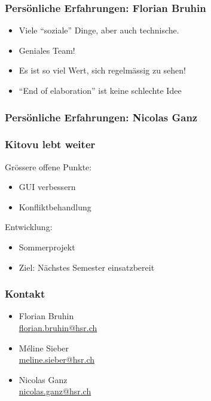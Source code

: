 \documentclass{beamer}
\begin{document}
	\begin{frame}
	   	\frametitle{Persönliche Erfahrungen: Florian Bruhin}
      \begin{itemize}
        \item Viele ``soziale'' Dinge, aber auch technische.
        \item Geniales Team!
        \item Es ist so viel Wert, sich regelmässig zu sehen!
        \item ``End of elaboration'' ist keine schlechte Idee
      \end{itemize}
	\end{frame}
	\begin{frame}
	    	\frametitle{Persönliche Erfahrungen: Nicolas Ganz}
	\end{frame}
	
	
	\begin{frame}
	\frametitle{Kitovu lebt weiter}
	
	Grössere offene Punkte:
	\begin{itemize}
	  \item GUI verbessern
	  \item Konfliktbehandlung
	\end{itemize}
	
	Entwicklung:
	\begin{itemize}
	  \item Sommerprojekt
	  \item Ziel: Nächstes Semester einsatzbereit
	\end{itemize}
	\end{frame}
	
	\begin{frame}
	\frametitle{Kontakt}
	\begin{itemize}
	  \item Florian Bruhin \\ \url{florian.bruhin@hsr.ch} \\[2em]
	  \item Méline Sieber \\ \url{meline.sieber@hsr.ch} \\[2em]
	  \item Nicolas Ganz \\ \url{nicolas.ganz@hsr.ch}
	\end{itemize}
	\end{frame}
\end{document}
